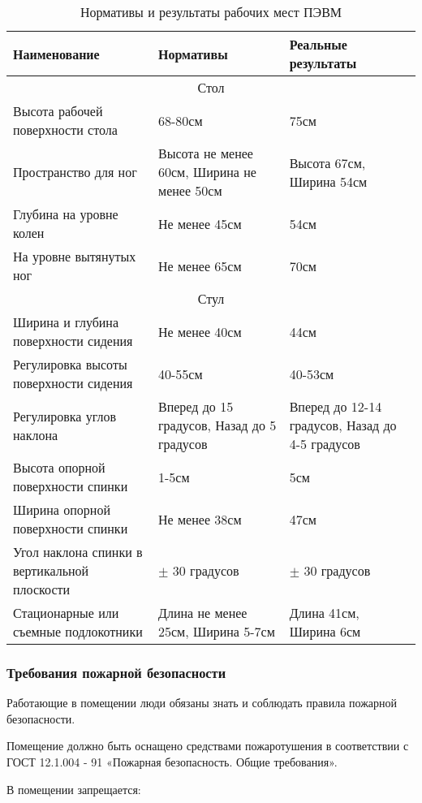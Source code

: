 \begin{center}
 \begin{longtable}[h]{|*3{m{}|}}
  \caption{Нормативы и результаты рабочих мест ПЭВМ} \label{tab:pevm} \\
  \hline
  Наименование & Нормативы & Реальные результаты \\
  \hline
  \multicolumn{3}{|c|}{Стол} \\
  \hline  
  Высота рабочей поверхности стола & 68-80см & 75см \\
  \hline
  Пространство для ног & Высота не менее 60см, Ширина не менее 50см & Высота 67см, Ширина 54см \\
  \hline
  Глубина на уровне колен & Не менее 45см & 54см \\
  \hline
  На уровне вытянутых ног & Не менее 65см & 70см \\
  \hline
  \multicolumn{3}{|c|}{Стул} \\
  \hline
  Ширина и глубина поверхности сидения & Не менее 40см & 44см\\
  \hline
  Регулировка высоты поверхности сидения & 40-55см & 40-53см\\
  \hline
  Регулировка углов наклона & Вперед до 15 градусов, Назад до 5 градусов & Вперед до 12-14 градусов, Назад до 4-5 градусов \\
  \hline
  Высота опорной поверхности спинки & 1-5см & 5см \\
  \hline
  Ширина опорной поверхности спинки & Не менее 38см & 47см \\
  \hline
  Угол наклона спинки в вертикальной плоскости & $\pm$ 30 градусов & $\pm$ 30 градусов \\
  \hline
  Стационарные или съемные подлокотники & Длина не менее 25см, Ширина 5-7см & Длина 41см, Ширина 6см \\
  \hline
 \end{longtable}
\end{center}

\subsubsection{Требования пожарной безопасности}

Работающие в помещении люди обязаны знать и соблюдать правила пожарной безопасности.

Помещение должно быть оснащено средствами пожаротушения в соответствии с ГОСТ 12.1.004 - 91 «Пожарная безопасность. Общие требования».

В помещении запрещается:

